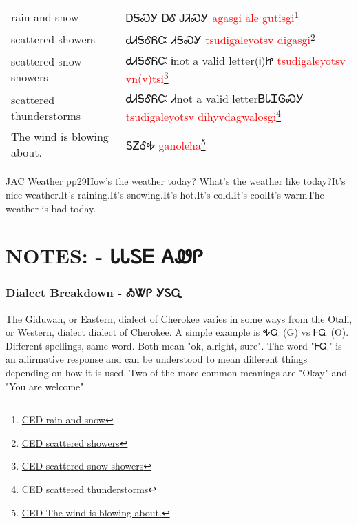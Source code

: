 \begin{minipage}{\linewidth}
\begin{tabular}{p{3cm} p{11cm}}
rain and snow & ᎠᎦᏍᎩ ᎠᎴ ᎫᏘᏍᎩ 
 \newline \textcolor{red}{agasgi ale gutisgi}\footnote{\href{https://cherokeedictionary.net/share/101983}{CED rain and snow}}\\
scattered showers & ᏧᏗᎦᎴᏲᏨ ᏗᎦᏍᎩ 
 \newline \textcolor{red}{tsudigaleyotsv digasgi}\footnote{\href{https://cherokeedictionary.net/share/101984}{CED scattered showers}}\\
scattered snow showers & ᏧᏗᎦᎴᏲᏨ Ꭵnot a valid letter(Ꭵ)Ꮵ 
 \newline \textcolor{red}{tsudigaleyotsv vn(v)tsi}\footnote{\href{https://cherokeedictionary.net/share/101985}{CED scattered snow showers}}\\
scattered thunderstorms & ᏧᏗᎦᎴᏲᏨ  Ꮧnot a valid letterᏴᏓᏆᎶᏍᎩ 
 \newline \textcolor{red}{tsudigaleyotsv  dihyvdagwalosgi}\footnote{\href{https://cherokeedictionary.net/share/101986}{CED scattered thunderstorms}}\\
The wind is blowing about. & ᎦᏃᎴᎭ 
 \newline \textcolor{red}{ganoleha}\footnote{\href{https://cherokeedictionary.net/share/101987}{CED The wind is blowing about.}}\\
\end{tabular}
\end{minipage}

JAC Weather pp29How's the weather today? What's the weather like today?It's nice weather.It's raining.It's snowing.It's hot.It's cold.It's coolIt's warmThe weather is bad today.
\chapter{NOTES: - ᏓᏓᏚᎬ ᎪᏪᎵ 
}
\subsection{Dialect Breakdown - ᎣᏔᎵ  ᎩᏚᏩ}
The Giduwah, or Eastern, dialect of Cherokee varies in some ways from the Otali, or Western, dialect dialect of Cherokee.  A simple example is ᎭᏩ (G) vs ᎰᏩ (O).  Different spellings, same word.  Both mean "ok, alright, sure".  The word "ᎰᏩ" is an affirmative response and can be understood to mean different things depending on how it is used. Two of the more common meanings are "Okay" and "You are welcome".\cite{joynerlesson4}

